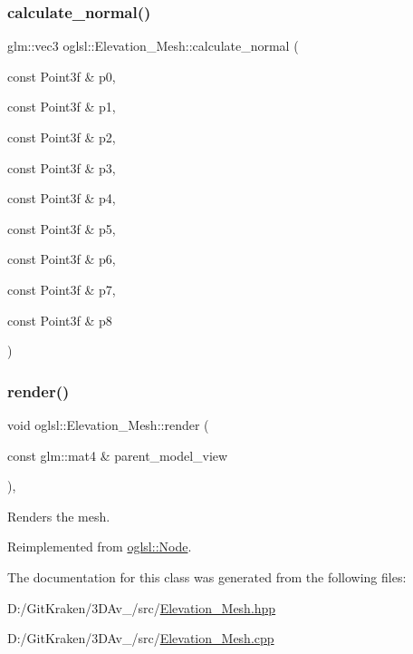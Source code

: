 \subsubsection{\texorpdfstring{calculate\+\_\+normal()}{calculate\_normal()}\hspace{0.1cm}{\footnotesize\ttfamily [2/2]}}
{\footnotesize\ttfamily glm\+::vec3 oglsl\+::\+Elevation\+\_\+\+Mesh\+::calculate\+\_\+normal (\begin{DoxyParamCaption}\item[{const Point3f \&}]{p0,  }\item[{const Point3f \&}]{p1,  }\item[{const Point3f \&}]{p2,  }\item[{const Point3f \&}]{p3,  }\item[{const Point3f \&}]{p4,  }\item[{const Point3f \&}]{p5,  }\item[{const Point3f \&}]{p6,  }\item[{const Point3f \&}]{p7,  }\item[{const Point3f \&}]{p8 }\end{DoxyParamCaption})}

\mbox{\label{classoglsl_1_1_elevation___mesh_afb39dc1633680dccabb4b8da72ac4733}} 
\subsubsection{\texorpdfstring{render()}{render()}}
{\footnotesize\ttfamily void oglsl\+::\+Elevation\+\_\+\+Mesh\+::render (\begin{DoxyParamCaption}\item[{const glm\+::mat4 \&}]{parent\+\_\+model\+\_\+view }\end{DoxyParamCaption})\hspace{0.3cm}{\ttfamily [override]}, {\ttfamily [virtual]}}



Renders the mesh. 



Reimplemented from \mbox{\hyperlink{classoglsl_1_1_node_a09545b18a2d798327601a6251c091444}{oglsl\+::\+Node}}.



The documentation for this class was generated from the following files\+:\begin{DoxyCompactItemize}
\item 
D\+:/\+Git\+Kraken/3\+D\+Av\+\_/src/\mbox{\hyperlink{_elevation___mesh_8hpp}{Elevation\+\_\+\+Mesh.\+hpp}}\item 
D\+:/\+Git\+Kraken/3\+D\+Av\+\_/src/\mbox{\hyperlink{_elevation___mesh_8cpp}{Elevation\+\_\+\+Mesh.\+cpp}}\end{DoxyCompactItemize}
